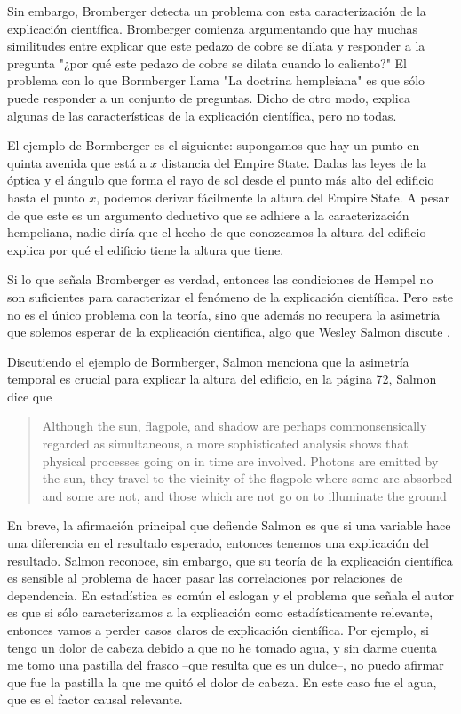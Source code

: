 Sin embargo, Bromberger \citeyear{Bromberger1950} detecta un problema con esta caracterización
de la explicación científica. Bromberger comienza argumentando que
hay muchas similitudes entre explicar que este pedazo de cobre se
dilata y responder a la pregunta "¿por qué este pedazo de cobre se
dilata cuando lo caliento?" El problema con lo que Bormberger llama
"La doctrina hempleiana" es que sólo puede responder a un conjunto
de preguntas. Dicho de otro modo, explica algunas de las
características de la explicación científica, pero no todas.

El ejemplo de Bormberger es el siguiente: supongamos que hay un
punto en quinta avenida que está a $x$ distancia del Empire State.
Dadas las leyes de la óptica y el ángulo que forma el rayo de sol
desde el punto más alto del edificio hasta el punto $x$, podemos
derivar fácilmente la altura del Empire State. A pesar de que este
es un argumento deductivo que se adhiere a la caracterización
hempeliana, nadie diría que el hecho de que conozcamos la altura del
edificio explica por qué el edificio tiene la altura que tiene.

Si lo que señala Bromberger es verdad, entonces las condiciones de Hempel no son suficientes para caracterizar el fenómeno de la explicación científica. Pero este no es el único problema con la teoría, sino que además no recupera la asimetría que solemos esperar de la explicación científica, algo que Wesley Salmon discute \citeyear{Salmon1970}.

Discutiendo el ejemplo de Bormberger, Salmon menciona que la asimetría temporal es crucial para explicar la altura del edificio, en la página 72, Salmon dice que

    \begin{quote}
    Although the sun, flagpole, and shadow are perhaps 
    commonsensically regarded as simultaneous, a more sophisticated 
    analysis shows that physical processes going on in time are 
    involved. Photons are emitted by the sun, they travel to the 
    vicinity of the flagpole where some are absorbed and some are 
    not, and those which are not go on to illuminate the ground
    \end{quote}

En breve, la afirmación principal que defiende Salmon es que si una
variable hace una diferencia en el resultado esperado, entonces
tenemos una explicación del resultado. Salmon reconoce, sin embargo,
que su teoría de la explicación científica es sensible al problema
de hacer pasar las correlaciones por relaciones de dependencia. En
estadística es común el eslogan  y el problema que señala el autor es que si sólo
caracterizamos a la explicación como estadísticamente relevante,
entonces vamos a perder casos claros de explicación científica. Por
ejemplo, si tengo un dolor de cabeza debido a que no he tomado agua, 
y sin darme cuenta me tomo una pastilla del frasco --que resulta que 
es un dulce--, no puedo afirmar que fue la pastilla la que me quitó 
el dolor de cabeza. En este caso fue el agua, que es el factor 
causal relevante.

